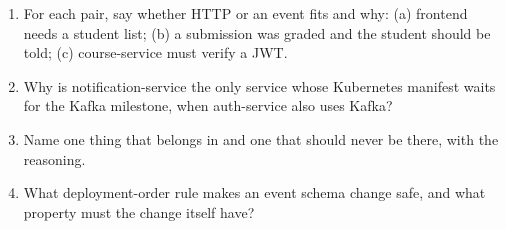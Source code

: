 \begin{quiz}
\begin{enumerate}
  \item For each pair, say whether HTTP or an event fits and why:
  (a) frontend needs a student list; (b) a submission was graded and the
  student should be told; (c) course-service must verify a JWT.
  \item Why is notification-service the only service whose Kubernetes
  manifest waits for the Kafka milestone, when auth-service also uses
  Kafka?
  \item Name one thing that belongs in  and one that should
  never be there, with the reasoning.
  \item What deployment-order rule makes an event schema change safe,
  and what property must the change itself have?
\end{enumerate}
\end{quiz}
